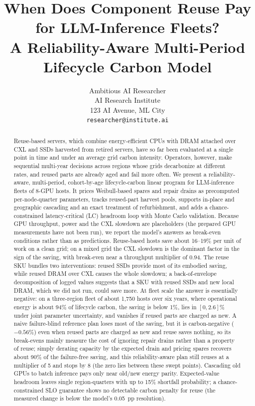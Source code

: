 \documentclass{article} %
\title{When Does Component Reuse Pay for LLM-Inference Fleets? \\ A Reliability-Aware Multi-Period Lifecycle Carbon Model}
\author{Ambitious AI Researcher\\
AI Research Institute\\
123 AI Avenue, ML City\\
\texttt{researcher@institute.ai}
}
\begin{document}
\maketitle

\begin{abstract}
Reuse-based servers, which combine energy-efficient CPUs with DRAM attached over CXL and SSDs harvested from retired servers, have so far been evaluated at a single point in time and under an average grid carbon intensity. Operators, however, make sequential multi-year decisions across regions whose grids decarbonize at different rates, and reused parts are already aged and fail more often. We present a reliability-aware, multi-period, cohort-by-age lifecycle-carbon linear program for LLM-inference fleets of 8-GPU hosts. It prices Weibull-based spares and repair drains as precomputed per-node-quarter parameters, tracks reused-part harvest pools, supports in-place and geographic cascading and an exact treatment of refurbishment, and adds a chance-constrained latency-critical (LC) headroom loop with Monte Carlo validation. Because GPU throughput, power and the CXL slowdown are placeholders (the prepared GPU measurements have not been run), we report the model's answers as break-even conditions rather than as predictions. Reuse-based hosts save about 16--19\% per unit of work on a clean grid; on a mixed grid the CXL slowdown is the dominant factor in the sign of the saving, with break-even near a throughput multiplier of 0.94. The reuse SKU bundles two interventions: reused SSDs provide most of its embodied saving, while reused DRAM over CXL causes the whole slowdown; a back-of-envelope decomposition of logged values suggests that a SKU with reused SSDs and new local DRAM, which we did not run, could save more. At fleet scale the answer is essentially negative: on a three-region fleet of about 1,750 hosts over six years, where operational energy is about 94\% of lifecycle carbon, the saving is below 1\%, lies in $[0, 2.6]\%$ under joint parameter uncertainty, and vanishes if reused parts are charged as new. A naive failure-blind reference plan loses most of the saving, but it is carbon-negative ($-0.56\%$) even when reused parts are charged as new and reuse saves nothing, so its break-evens mainly measure the cost of ignoring repair drains rather than a property of reuse; simply derating capacity by the expected drain and pricing spares recovers about 90\% of the failure-free saving, and this reliability-aware plan still reuses at a multiplier of 5 and stops by 8 (the zero lies between these swept points). Cascading old GPUs to batch inference pays only near old/new energy parity. Expected-value headroom leaves single region-quarters with up to 15\% shortfall probability; a chance-constrained SLO guarantee shows no detectable carbon penalty for reuse (the measured change is below the model's 0.05~pp resolution).
\end{abstract}
\end{document}
